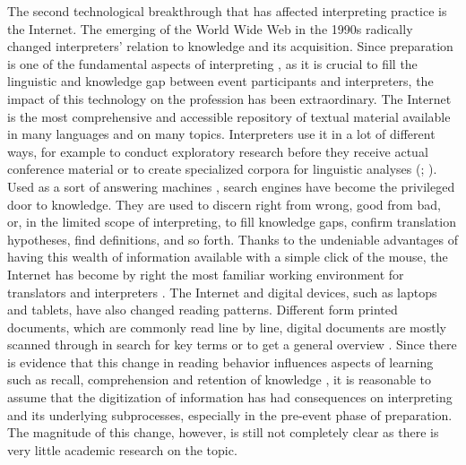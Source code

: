\documentclass[output=paper]{langsci/langscibook}
\begin{document}
The second technological breakthrough that has affected interpreting practice is the Internet. The emerging of the World Wide Web in the 1990s radically changed interpreters’ relation to knowledge and its acquisition. Since preparation is one of the fundamental aspects of interpreting \citep{Gile2009}, as it is crucial to fill the linguistic and knowledge gap between event participants and interpreters, the impact of this technology on the profession has been extraordinary. The Internet is the most comprehensive and accessible repository of textual material available in many languages and on many topics. Interpreters use it in a lot of different ways, for example to conduct exploratory research before they receive actual conference material \citep{chang_conference_2018} or to create specialized corpora for linguistic analyses (\citealt{Fantinuoli2017a,Fantinuoli2018c}; \citealt{xu_corpus-based_2018}). Used as a sort of answering machines \citep{finn_what_2017}, search engines have become the privileged door to knowledge. They are used to discern right from wrong, good from bad, or, in the limited scope of interpreting, to fill knowledge gaps, confirm translation hypotheses, find definitions, and so forth. Thanks to the undeniable advantages of having this wealth of information available with a simple click of the mouse, the Internet has become by right the most familiar working environment for translators and interpreters \citep{zanettin_corpora_2002}. The Internet and digital devices, such as laptops and tablets, have also changed reading patterns. Different form printed documents, which are commonly read line by line, digital documents are mostly scanned through in search for key terms or to get a general overview \citep{pernice_f-shaped_2017}. Since there is evidence that this change in reading behavior influences aspects of learning such as recall, comprehension and retention of knowledge \citep{ross_print_2017}, it is reasonable to assume that the digitization of information has had consequences on interpreting and its underlying subprocesses, especially in the pre-event phase of preparation. The magnitude of this change, however, is still not completely clear as there is very little academic research on the topic.%
 
\end{document}
